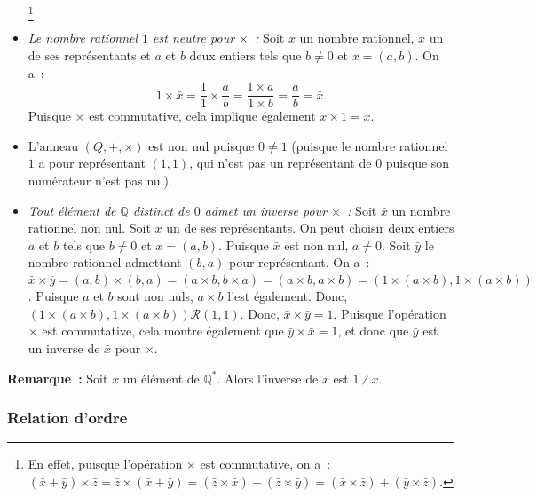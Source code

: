 \begin{itemize}[nosep]
            \footnote{En effet, puisque l'opération $\times$ est commutative, on a : $(\bar{x} + \bar{y}) \times \bar{z} = \bar{z} \times (\bar{x} + \bar{y}) = (\bar{z} \times \bar{x}) + (\bar{z} \times \bar{y}) = (\bar{x} \times \bar{z}) + (\bar{y} \times \bar{z})$.}
    \item \emph{Le nombre rationnel $1$ est neutre pour $\times$ :} 
        Soit $\bar{x}$ un nombre rationnel, $x$ un de ses représentants et $a$ et $b$ deux entiers tels que $b \neq 0$ et $x = (a, b)$. 
        On a : 
        \begin{equation*}
            1 \times \bar{x} = \frac{1}{1} \times \frac{a}{b}
                = \frac{1 \times a}{1 \times b}
                = \frac{a}{b}
                = \bar{x}.
        \end{equation*}
        Puisque $\times$ est commutative, cela implique également $\bar{x} \times 1 = \bar{x}$.
    \item L'anneau $(Q, +, \times)$ est non nul puisque $0 \neq 1$ (puisque le nombre rationnel $1$ a pour représentant $(1,1)$, qui n'est pas un représentant de $0$ puisque son numérateur n'est pas nul).
    \item \emph{Tout élément de $\mathbb{Q}$ distinct de $0$ admet un inverse pour $\times$ :} 
        Soit $\bar{x}$ un nombre rationnel non nul. 
        Soit $x$ un de ses représentants. 
        On peut choisir deux entiers $a$ et $b$ tels que $b \neq 0$ et $x = (a, b)$.
        Puisque $\bar{x}$ est non nul, $a \neq 0$. 
        Soit $\bar{y}$ le nombre rationnel admettant $(b, a)$ pour représentant.
        On a : $\bar{x} \times \bar{y} = \overline{(a, b)} \times \overline{(b, a)} = \overline{(a \times b, b \times a)} = \overline{(a \times b, a \times b)} = \overline{(1 \times (a \times b), 1 \times (a \times b))}$.
        Puisque $a$ et $b$ sont non nuls, $a \times b$ l'est également.
        Donc, $(1 \times (a \times b), 1 \times (a \times b)) \mathrel{\mathcal{R}} (1, 1)$.
        Donc, $\bar{x} \times \bar{y} = 1$.
        Puisque l'opération $\times$ est commutative, cela montre également que $\bar{y} \times \bar{x} = 1$, et donc que $\bar{y}$ est un inverse de $\bar{x}$ pour $\times$.
\end{itemize}

\medskip

\noindent\textbf{Remarque :} Soit $x$ un élément de $\mathbb{Q}^*$. 
    Alors l'inverse de $x$ est $1 \divslash x$. 

\done

\subsubsection{Relation d'ordre}

